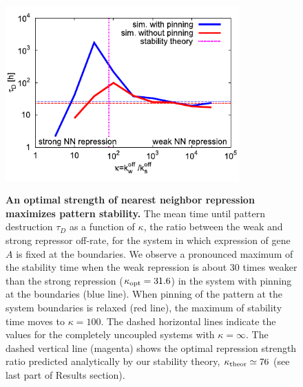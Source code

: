 \documentclass[a4paper,10pt]{article}
\newcommand{\GA}{A\xspace}
\begin{document}
\begin{figure}[ht!]
  \centering
    \includegraphics[width=0.8\textwidth]{Figures/FigureStabilityGrouped.pdf}
    \label{Fig-StabilityGrouped}
  \caption{
\textbf{An optimal strength of nearest neighbor repression maximizes pattern stability.}
	  The mean time until pattern destruction $\tau_D$ as a function of $\kappa$, 
	  the ratio between the weak and strong repressor off-rate, for the system in which expression 
	  of gene $\GA$ is fixed at the boundaries.
	  We observe a pronounced maximum of the stability time when the weak repression is about
	  30 times weaker than the strong repression ($\kappa_{\rm opt} = 31.6$) in the system with pinning at the boundaries (blue line).
   When pinning of the pattern at the system boundaries is relaxed (red line), the maximum of stability time moves to $\kappa = 100$.
   The dashed horizontal lines indicate the values for the completely uncoupled systems with $\kappa = \infty$.
   The dashed vertical line (magenta) shows the optimal repression strength ratio predicted analytically by our stability theory, $\kappa_{\rm theor} \simeq 76$ (see last part of Results section).
  \label{Fig-Stability}
}
\end{figure}
\end{document}
